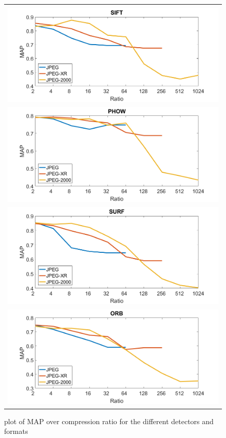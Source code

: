 \documentclass[10pt,a4paper]{article}
\begin{document}
\begin{figure}[!htp]
	\begin{tabular}{|c|}
		\hline \\
		\includegraphics[width = \textwidth]{img/sift_map.png}\\
		\includegraphics[width = \textwidth]{img/phow_map.png}\\
		\includegraphics[width = \textwidth]{img/surf_map.png}\\
		\includegraphics[width = \textwidth]{img/orb_map.png}\\
		\hline
	\end{tabular}
	\caption{plot of MAP over compression ratio for the different
	\label{fig:maps} detectors and formats}
\end{figure}
\FloatBarrier
\printbibliography
\end{document}
